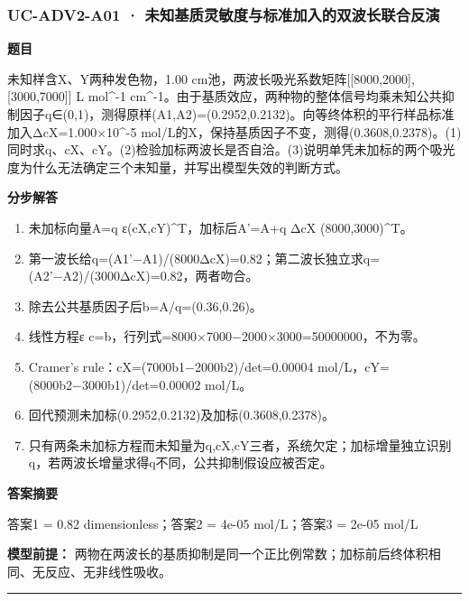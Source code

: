\documentclass[UTF8,11pt,a4paper]{ctexart}
\begin{document}
\subsubsection*{UC-ADV2-A01 · 未知基质灵敏度与标准加入的双波长联合反演}
\noindent\textbf{题目}\par
未知样含X、Y两种发色物，1.00 cm池，两波长吸光系数矩阵[[8000,2000],[3000,7000]] L mol\textasciicircum{}-1 cm\textasciicircum{}-1。由于基质效应，两种物的整体信号均乘未知公共抑制因子q∈(0,1)，测得原样(A1,A2)=(0.2952,0.2132)。向等终体积的平行样品标准加入ΔcX=1.000×10\textasciicircum{}-5 mol/L的X，保持基质因子不变，测得(0.3608,0.2378)。(1)同时求q、cX、cY。(2)检验加标两波长是否自洽。(3)说明单凭未加标的两个吸光度为什么无法确定三个未知量，并写出模型失效的判断方式。\par
\medskip\noindent\textbf{分步解答}
\begin{enumerate}
\item 未加标向量A=q ε(cX,cY)\textasciicircum{}T，加标后A'=A+q ΔcX (8000,3000)\textasciicircum{}T。
\item 第一波长给q=(A1'−A1)/(8000ΔcX)=0.82；第二波长独立求q=(A2'−A2)/(3000ΔcX)=0.82，两者吻合。
\item 除去公共基质因子后b=A/q=(0.36,0.26)。
\item 线性方程ε c=b，行列式=8000×7000−2000×3000=50000000，不为零。
\item Cramer's rule：cX=(7000b1−2000b2)/det=0.00004 mol/L，cY=(8000b2−3000b1)/det=0.00002 mol/L。
\item 回代预测未加标(0.2952,0.2132)及加标(0.3608,0.2378)。
\item 只有两条未加标方程而未知量为q,cX,cY三者，系统欠定；加标增量独立识别q，若两波长增量求得q不同，公共抑制假设应被否定。
\end{enumerate}
\noindent\textbf{答案摘要}\par
答案1 = 0.82 dimensionless；答案2 = 4e-05 mol/L；答案3 = 2e-05 mol/L\par
\noindent\textbf{模型前提：}
两物在两波长的基质抑制是同一个正比例常数；加标前后终体积相同、无反应、无非线性吸收。\par
\medskip\hrule\medskip
{}
\end{document}
